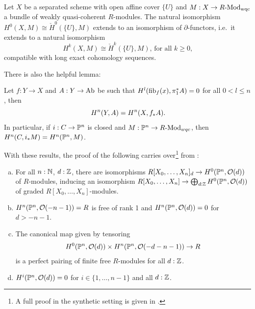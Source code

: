 \begin{theorem}
  Let $X$ be a separated scheme with open affine cover $\{U\}$ and $M:X\to R\text{-}\mathrm{Mod}_{\mathrm{wqc}}$ a bundle of weakly quasi-coherent $R$-modules.
  The natural isomorphism $H^0(X,M) \cong \check{H}^0(\{U\},M)$ extends to an isomorphism of $\partial$-functors,
  i.e.\ it extends to a natural isomorphism
  \[ H^k(X,M) \cong \check{H}^k(\{U\},M)\text{, for all $k\geq 0$,}
  \]
  compatible with long exact cohomology sequences.
\end{theorem}

There is also the helpful lemma:


\begin{lemma}
  \label{cohomologically-trivial-fibers}
  Let $f:Y\to X$ and $A:Y\to\operatorname{Ab}$ be such that $H^l(\mathrm{fib}_f(x),\pi_1^\ast A)=0$ for all $0<l\leq n$,
  then
  \[
  H^n(Y,A)=H^n(X,f_\ast A)
  \rlap{.}
  \]
  In particular, if $i:C\to \mathbb{P}^n$ is closed and $M:\mathbb{P}^n\to R\text{-}\mathrm{Mod}_{wqc}$, then $H^n(C,i_\ast M)=H^n(\mathbb{P}^n,M)$.
\end{lemma}

With these results, the proof of the following carries over\footnote{A full proof in the synthetic setting is given in \cite{cech-draft}.}
from \cite[Chapter III]{Hartshorne}:

\begin{theorem}
  \label{calculate-cohomology-twisting-sheaves}
  \begin{enumerate}[(a)]
  \item \label{calculate-cohomology-twisting-sheaves-a}
  For all $n:\mathbb{N}$, $d:\mathbb{Z}$, there are isomorphisms $R[X_0,\dots,X_n]_d\to H^0(\mathbb{P}^n,\mathcal O(d))$ of $R$-modules, inducing an isomorphism $R[X_0,\dots,X_n]\to \bigoplus_{d:\mathbb{Z}} H^0(\mathbb{P}^n,\mathcal O(d))$ of graded $R[X_0,\dots,X_n]$-modules.
  \item \label{calculate-cohomology-twisting-sheaves-b}
        $H^n(\mathbb{P}^n,\mathcal O(-n-1))=R$ is free of rank 1 and $H^n(\mathbb{P}^n,\mathcal O(d))=0$ for $d>-n-1$.
  \item \label{calculate-cohomology-twisting-sheaves-c}
    The canonical map given by tensoring
    \[
      H^0(\mathbb{P}^n,\mathcal O(d)) \times H^n(\mathbb{P}^n,\mathcal O(-d-n-1))\to R
    \]
    is a perfect pairing of finite free $R$-modules for all $d:\mathbb{Z}$.
  \item $H^i(\mathbb{P}^n,\mathcal O(d))=0$ for $i\in\{1,\dots,n-1\}$ and all $d:\mathbb{Z}$.
  \end{enumerate}
\end{theorem}






